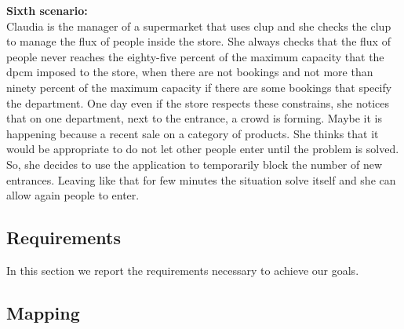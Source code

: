 \textbf{Sixth scenario:}\\
Claudia is the manager of a supermarket that uses \gls{clup} and she checks the \gls{clup} to manage the flux of people inside the store. She always checks that the flux of people never reaches the eighty-five percent of the maximum capacity that the \gls{dpcm} imposed to the store, when there are not bookings and not more than ninety percent of the maximum capacity if there are some bookings that specify the department.
One day even if the store respects these constrains, she notices that on one department, next to the entrance, a crowd is forming. Maybe it is happening because a recent sale on a category of products. She thinks that it would be appropriate to do not let other people enter until the problem is solved. So, she decides to use the application to temporarily block the number of new entrances. Leaving like that for few minutes the situation solve itself and she can allow again people to enter.\\

\subsection{Requirements}

In this section we report the requirements necessary to achieve our goals.

\subsection{Mapping}

